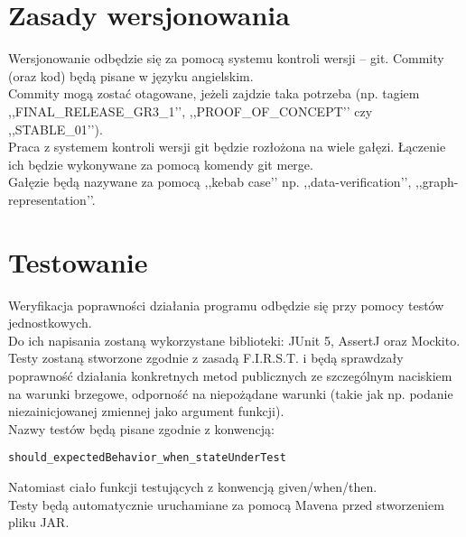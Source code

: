 \documentclass{article}
\begin{document}
\section{Zasady wersjonowania}
{\fontsize{12}{12}\selectfont
Wersjonowanie odbędzie się za pomocą systemu kontroli wersji -- git.
Commity (oraz kod) będą pisane w języku angielskim. \\

Commity mogą zostać otagowane, jeżeli zajdzie taka potrzeba (np. tagiem ,,FINAL\_RELEASE\_GR3\_1’’,  ,,PROOF\_OF\_CONCEPT’’ czy ,,STABLE\_01’’). \\

Praca z systemem kontroli wersji git będzie rozłożona na wiele gałęzi. Łączenie ich będzie wykonywane za pomocą komendy git merge. \\

Gałęzie będą nazywane za pomocą ,,kebab case’’ np. ,,data-verification’’, ,,graph-representation’’.
}


\section{Testowanie}
{\fontsize{12}{12}\selectfont
Weryfikacja poprawności działania programu odbędzie się przy pomocy testów jednostkowych. \\

Do ich napisania zostaną wykorzystane biblioteki: JUnit 5, AssertJ oraz Mockito. \\

Testy zostaną stworzone zgodnie z zasadą F.I.R.S.T. i będą sprawdzały poprawność działania konkretnych metod publicznych ze szczególnym naciskiem na warunki brzegowe, odporność na niepożądane warunki (takie jak np. podanie niezainicjowanej zmiennej jako argument funkcji). \\

Nazwy testów będą pisane zgodnie z konwencją:
        \begin{center}
            \texttt{should\_expectedBehavior\_when\_stateUnderTest}
        \end{center}
Natomiast ciało funkcji testujących z konwencją given/when/then. \\

Testy będą automatycznie uruchamiane za pomocą Mavena przed stworzeniem pliku JAR.
}

\clearpage
{}
\end{document}
